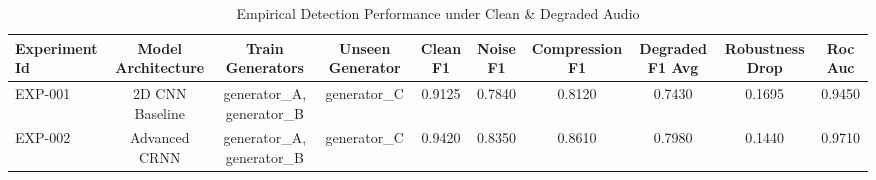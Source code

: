 \begin{table}[ht]
\centering
\caption{Empirical Detection Performance under Clean & Degraded Audio}
\label{tab:model_comparison}
\begin{tabular}{lccccccccc}
\hline\hline
Experiment Id & Model Architecture & Train Generators & Unseen Generator & Clean F1 & Noise F1 & Compression F1 & Degraded F1 Avg & Robustness Drop & Roc Auc \\
\hline
EXP-001 & 2D CNN Baseline & generator_A, generator_B & generator_C & 0.9125 & 0.7840 & 0.8120 & 0.7430 & 0.1695 & 0.9450 \\
EXP-002 & Advanced CRNN & generator_A, generator_B & generator_C & 0.9420 & 0.8350 & 0.8610 & 0.7980 & 0.1440 & 0.9710 \\
\hline\hline
\end{tabular}
\end{table}